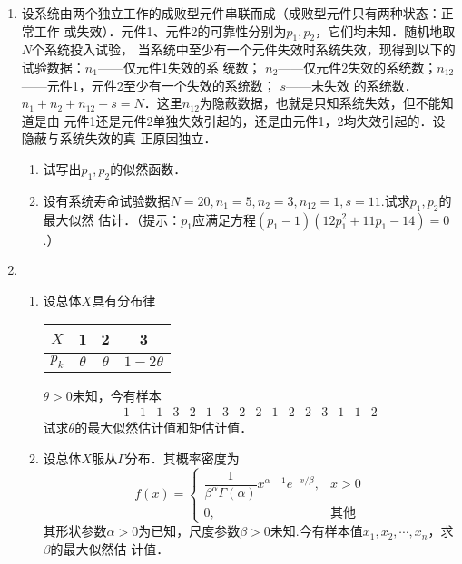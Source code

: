 \documentclass[10pt,a4paper]{article}
\begin{document}
\begin{enumerate}
    \item 设系统由两个独立工作的成败型元件串联而成（成败型元件只有两种状态：正常工作
    或失效）．元件1、元件2的可靠性分别为$p_1,p_2$，它们均未知．随机地取$N$个系统投入试验，
    当系统中至少有一个元件失效时系统失效，现得到以下的试验数据：$n_1$——仅元件1失效的系
    统数； $n_2$——仅元件2失效的系统数；$n_{12}$——元件1，元件2至少有一个失效的系统数； $s$——未失效
    的系统数．$n_1+n_2+n_{12}+s=N$．这里$n_{12}$为隐蔽数据，也就是只知系统失效，但不能知道是由
    元件1还是元件2单独失效引起的，还是由元件1，2均失效引起的．设隐蔽与系统失效的真
    正原因独立．
    \begin{enumerate}
        \item 试写出$p_1,p_2$的似然函数．
        \item 设有系统寿命试验数据$N=20,n_1=5,n_2=3,n_{12}=1,s=11$.试求$p_1,p_2$的最大似然
        估计．（提示：$p_1$应满足方程$(p_1-1)(12p_1^2+11p_1-14)=0$.）
    \end{enumerate}





    \item \begin{enumerate}
        \item 设总体$X$具有分布律
        \renewcommand{\arraystretch}{1.3}
        \begin{table}[H]\centering
            \begin{tabular}{c|ccc}
            $X$   & 1        & 2        & 3           \\ \hline
            $p_k$ & $\theta$ & $\theta$ & $1-2\theta$
            \end{tabular}
        \end{table}
        \renewcommand{\arraystretch}{1.0}
        $\theta>0$未知，今有样本
        $$\begin{array}{cccccccccccccccc}
            1 & 1 & 1 & 3 & 2 & 1 & 3 & 2 & 2 & 1 & 2 & 2 & 3 & 1 & 1 & 2 
        \end{array}$$
        试求$\theta$的最大似然估计值和矩估计值．
        \item 设总体$X$服从$\Gamma$分布．其概率密度为
        $$f(x)=\left\{\begin{array}{ll}
            \dfrac{1}{\beta^\alpha\Gamma(\alpha)}x^{\alpha-1}e^{-x/\beta}, & x>0\\
            0, & \mbox{其他}
        \end{array}\right.$$
        其形状参数$\alpha>0$为已知，尺度参数$\beta>0$未知.今有样本值$x_1,x_2,\cdots,x_n$，求$\beta$的最大似然估
        计值．
    \end{enumerate}






\end{enumerate}
\end{document}
